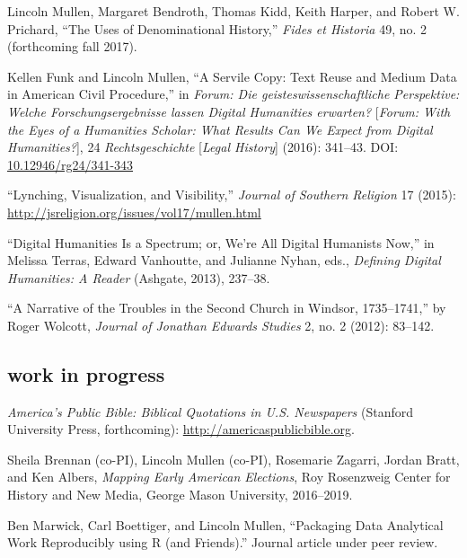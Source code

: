 \documentclass[11pt]{article}
\begin{document}
Lincoln Mullen, Margaret Bendroth, Thomas Kidd, Keith Harper, and Robert W. 
Prichard, ``The Uses of Denominational History,'' \emph{Fides et Historia} 49, 
no. 2 (forthcoming fall 2017).

Kellen Funk and Lincoln Mullen, ``A Servile Copy: Text Reuse and Medium Data 
in American Civil Procedure,'' in \emph{Forum: Die geisteswissenschaftliche 
  Perspektive: Welche Forschungsergebnisse lassen Digital Humanities 
  erwarten?} [\emph{Forum: With the Eyes of a Humanities Scholar: What Results 
  Can We Expect from Digital Humanities?}], 24 \emph{Rechtsgeschichte} 
[\emph{Legal History}] (2016): 341--43. DOI: 
\href{http://dx.doi.org/10.12946/rg24/341-343}{10.12946/rg24/341-343}

``Lynching, Visualization, and Visibility,'' \emph{Journal of Southern 
  Religion} 17 (2015): \url{http://jsreligion.org/issues/vol17/mullen.html}

``Digital Humanities Is a Spectrum; or, We're All Digital Humanists
Now,'' in Melissa Terras, Edward Vanhoutte, and Julianne Nyhan, eds.,
\emph{Defining Digital Humanities: A Reader} (Ashgate, 2013), 237--38.

``A Narrative of the Troubles in the Second Church in Windsor,
1735--1741,'' by Roger Wolcott, \emph{Journal of Jonathan Edwards
  Studies} 2, no. 2 (2012): 83--142.

\subsection{work in progress}\label{in-progress}

\emph{America's Public Bible: Biblical Quotations in U.S. Newspapers} 
(Stanford University Press, forthcoming): 
\url{http://americaspublicbible.org}.

Sheila Brennan (co-PI), Lincoln Mullen (co-PI), Rosemarie Zagarri, Jordan Bratt, 
and Ken Albers, \emph{Mapping Early American Elections}, Roy Rosenzweig Center 
for History and New Media, George Mason University, 2016--2019.

Ben Marwick, Carl Boettiger, and Lincoln Mullen, ``Packaging Data Analytical 
Work Reproducibly using R (and Friends).'' Journal article under peer review.


\end{document}
